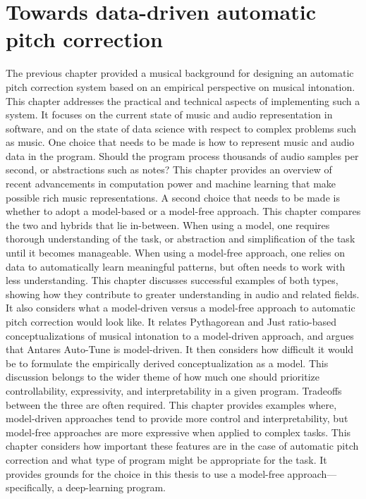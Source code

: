 \chapter{Towards data-driven automatic pitch correction}
\label{chap:tech-background}
The previous chapter provided a musical background for designing an automatic pitch correction system based on an empirical perspective on musical intonation. This chapter addresses the practical and technical aspects of implementing such a system. It focuses on the current state of music and audio representation in software, and on the state of data science with respect to complex problems such as music. One choice that needs to be made is how to represent music and audio data in the program. Should the program process thousands of audio samples per second, or abstractions such as notes? This chapter provides an overview of recent advancements in computation power and machine learning that make possible rich music representations. A second choice that needs to be made is whether to adopt a model-based or a model-free approach. This chapter compares the two and hybrids that lie in-between. When using a model, one requires thorough understanding of the task, or abstraction and simplification of the task until it becomes manageable. When using a model-free approach, one relies on data to automatically learn meaningful patterns, but often needs to work with less understanding. This chapter discusses successful examples of both types, showing how they contribute to greater understanding in audio and related fields. It also considers what a model-driven versus a model-free approach to automatic pitch correction would look like. It relates Pythagorean and Just ratio-based conceptualizations of musical intonation to a model-driven approach, and argues that Antares Auto-Tune is model-driven. It then considers how difficult it would be to formulate the empirically derived conceptualization as a model. This discussion belongs to the wider theme of how much one should prioritize controllability, expressivity, and interpretability in a given program. Tradeoffs between the three are often required. This chapter provides examples where, model-driven approaches tend to provide more control and interpretability, but model-free approaches are more expressive when applied to complex tasks. This chapter considers how important these features are in the case of automatic pitch correction and what type of program might be appropriate for the task. It provides grounds for the choice in this thesis to use a model-free approach---specifically, a deep-learning program. 

